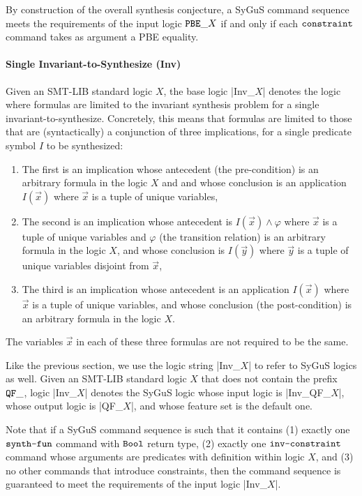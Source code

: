 \documentclass[english,a4paper,10pt]{article}
\begin{document}
By construction of the overall synthesis conjecture, a SyGuS command sequence
meets the requirements of the input logic ${\tt PBE\_}X$
if and only if each ${\tt constraint}$ command takes as argument a PBE equality.

\paragraph{Single Invariant-to-Synthesize (Inv)}
Given an SMT-LIB standard logic $X$,
the base logic \code|Inv_$X$| denotes the logic
where formulas are limited to the invariant synthesis
problem for a single invariant-to-synthesize.
Concretely,
this means that formulas are limited to those that 
are (syntactically) a conjunction of three implications, 
for a single predicate symbol $I$ to be synthesized:
\begin{enumerate}
\item The first is an implication whose antecedent (the pre-condition) 
is an arbitrary formula
in the logic $X$ and
and whose conclusion is
an application $I( \vec x )$ where $\vec x$ is a tuple of unique variables,

\item The second is an implication whose antecedent is
$I( \vec x ) \wedge \varphi$
where $\vec x$ is a tuple of unique variables and $\varphi$ (the transition relation) 
is an arbitrary formula
in the logic $X$,
and whose conclusion is $I( \vec y )$
where $\vec y$ is a tuple of unique variables disjoint from $\vec x$,

\item The third is an implication whose antecedent is 
an application $I( \vec x )$ where $\vec x$ is a tuple of unique variables,
and whose conclusion (the post-condition) is an arbitrary formula in the logic $X$.
\end{enumerate}
The variables $\vec x$ in each of these three formulas are not required to be the same.

Like the previous section, 
we use the logic string \code|Inv_$X$| to refer to SyGuS logics as well.
Given an SMT-LIB standard logic $X$
that does not contain the prefix ${\tt QF\_}$,
logic \code|Inv_$X$| denotes the SyGuS logic
whose input logic is \code|Inv_QF_$X$|,
whose output logic is \code|QF_$X$|,
and whose feature set is the default one.

Note that if a SyGuS command sequence is such that it contains
(1) exactly one $\texttt{synth-fun}$ command with $\texttt{Bool}$ return type,
(2) exactly one $\texttt{inv-constraint}$ command whose arguments are predicates with definition within logic $X$, and
(3) no other commands that introduce constraints,
then the command sequence is guaranteed to meet the requirements of the input logic \code|Inv_$X$|.
\end{document}
